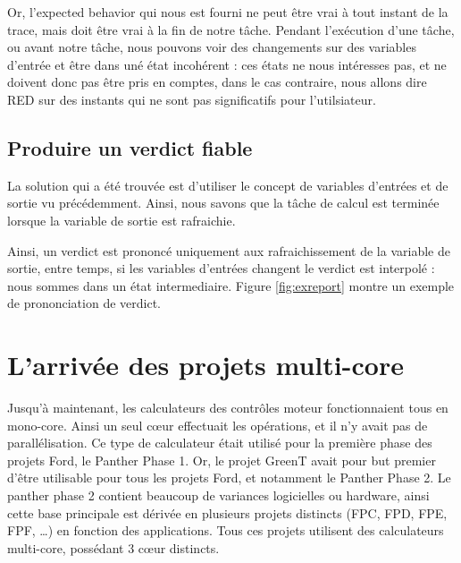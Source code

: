 Or, l'expected behavior qui nous est fourni ne peut être vrai à tout instant de la trace, mais doit être vrai à la fin de notre tâche. Pendant l'exécution d'une tâche, ou avant notre tâche, nous pouvons voir des changements sur des variables d'entrée et être dans uné état incohérent : ces états ne nous intéresses pas, et ne doivent donc pas être pris en comptes, dans le cas contraire, nous allons dire RED sur des instants qui ne sont pas significatifs pour l'utilsiateur.

\subsection{Produire un verdict fiable}
La solution qui a été trouvée est d'utiliser le concept de variables d'entrées et de sortie vu précédemment. Ainsi, nous savons que la tâche de calcul est terminée lorsque la variable de sortie est rafraichie.  

Ainsi, un verdict est prononcé uniquement aux rafraichissement de la variable de sortie, entre temps, si les variables d'entrées changent le verdict est interpolé : nous sommes dans un état intermediaire. Figure \ref{fig:exreport} montre un exemple de prononciation de verdict. 





\section{L'arrivée des projets multi-core}
Jusqu'à maintenant, les calculateurs des contrôles moteur fonctionnaient tous en mono-core. Ainsi un seul c\oe{}ur effectuait les opérations, et il n'y avait pas de parallélisation. Ce type de calculateur était utilisé pour la première phase des projets Ford, le Panther Phase 1. Or, le projet GreenT avait pour but premier d'être utilisable pour tous les projets Ford, et notamment le Panther Phase 2. Le panther phase 2 contient beaucoup de variances logicielles ou hardware, ainsi cette base principale est dérivée en plusieurs projets distincts (FPC, FPD, FPE, FPF, \ldots) en fonction des applications. Tous ces projets utilisent des calculateurs multi-core, possédant 3 c\oe{}ur distincts. 

